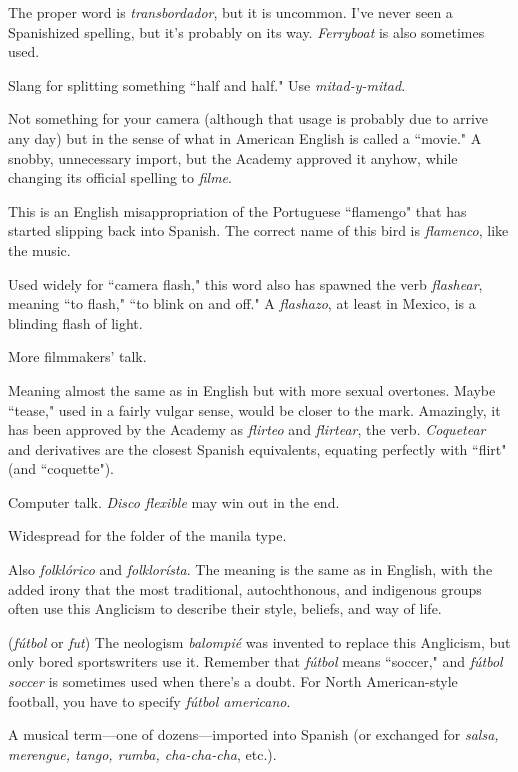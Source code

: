 The proper word is \emph{transbordador}, but it is uncommon. I've never seen a Spanishized spelling, but it's probably on its
way. \emph{Ferryboat} is also sometimes used.

 Slang for splitting something ``half and half."
Use \emph{mitad-y-mitad}.

 Not something for your camera (although that usage is
probably due to arrive any day) but in the sense of what in American
English is called a ``movie." A snobby, unnecessary import, but the
Academy approved it anyhow, while changing its official spelling to
\emph{filme}.

 This is an English misappropriation of the Portuguese ``flamengo" that has started slipping back into Spanish. The correct name of this bird is \emph{flamenco}, like the music.

 Used widely for ``camera flash," this word also has
spawned the verb \emph{flashear}, meaning ``to flash," ``to blink on and off."
A \emph{flashazo}, at least in Mexico, is a blinding flash of light.

 More filmmakers' talk.

 Meaning almost the same as in English but with more
sexual overtones. Maybe ``tease," used in a fairly vulgar sense, would be
closer to the mark. Amazingly, it has been approved by the Academy as
\emph{flirteo} and \emph{flirtear}, the verb. \emph{Coquetear} and derivatives are the closest
Spanish equivalents, equating perfectly with ``flirt" (and ``coquette").

 Computer talk. \emph{Disco flexible} may win out in the end.

 Widespread for the folder of the manila type.

 Also \emph{folklórico} and \emph{folklorísta}. The meaning is
the same as in English, with the added irony that the most traditional,
autochthonous, and indigenous groups often use this Anglicism to describe their style, beliefs, and way of life.

 (\emph{fútbol} or \emph{fut}) The neologism \emph{balompié} was invented to replace this Anglicism, but only bored sportswriters use it.
Remember that \emph{fútbol} means ``soccer," and \emph{fútbol soccer} is sometimes
used when there's a doubt. For North American-style football, you
have to specify \emph{fútbol americano}.

 A musical term---one of dozens---imported into
Spanish (or exchanged for \emph{salsa, merengue, tango, rumba, cha-cha-cha}, etc.).

